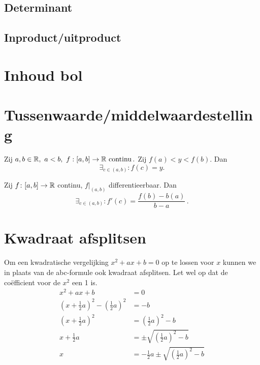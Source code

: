 \documentclass{article}
\begin{document}
    \subsection{Determinant}\label{sec:determinant}
    

    \subsection{Inproduct/uitproduct}\label{sec:inproduct/uitproduct}
    

    \section{Inhoud bol}\label{sec:inhoudBol}
    

    \section{Tussenwaarde/middelwaardestelling}\label{sec:tussenwaarde/middelwaardestelling}
    \begin{stelling}

        Zij $a,b \in \mathbb{R},\ a<b,\
            f:[a,b]\to \mathbb{R} \text{ continu}\,.
        $
        Zij $f(a)<y<f(b)$.
        Dan \[ \exists_{c\in(a,b)}:f(c)=y. \]
    \end{stelling}

    \begin{stelling}

        Zij $f\colon[a,b] \to \mathbb{R}$ continu, $f|_{(a,b)}$ differentieerbaar.
        Dan
        \[
            \exists_{c \in (a,b)} : f'(c) = \frac{f(b)-b(a)}{b-a}\,.
        \]
    \end{stelling}

    \section{Kwadraat afsplitsen}\label{sec:kwadraatAfsplitsen}
    Om een kwadratische vergelijking $x^2 + ax + b = 0$ op te lossen voor $x$ kunnen we in plaats van de abc-formule ook kwadraat afsplitsen.
    Let wel op dat de co\"efficient voor de $x^2$ een 1 is.
    \begin{align*}
        x^2 + a x + b &= 0 \\
        \left(x + \frac{1}{2} a\right)^2 - \left( \frac{1}{2}a \right)^2 &= - b \\
        \left(x + \frac{1}{2} a\right)^2 &= \left( \frac{1}{2}a \right)^2 - b \\
        x + \frac{1}{2} a &= \pm \sqrt{\left( \frac{1}{2}a \right)^2 - b} \\
        x &= -  \frac{1}{2} a \pm \sqrt{\left(\frac{1}{2}a \right)^2 - b}
    \end{align*}
\end{document}
